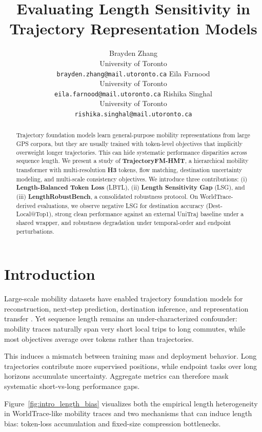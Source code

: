 \documentclass{article}
\title{Evaluating Length Sensitivity in Trajectory Representation Models}
\author{%
  Brayden Zhang\\
  University of Toronto\\
  \texttt{brayden.zhang@mail.utoronto.ca}
  \And
  Eila Farnood\\
  University of Toronto\\
  \texttt{eila.farnood@mail.utoronto.ca}
  \And
  Rishika Singhal\\
  University of Toronto\\
  \texttt{rishika.singhal@mail.utoronto.ca}
}
\begin{document}
\maketitle

\begin{abstract}
Trajectory foundation models learn general-purpose mobility representations from large GPS corpora, but they are usually trained with token-level objectives that implicitly overweight longer trajectories. This can hide systematic performance disparities across sequence length. We present a study of \textbf{TrajectoryFM-HMT}, a hierarchical mobility transformer with multi-resolution \textbf{H3} tokens, flow matching, destination uncertainty modeling, and multi-scale consistency objectives. We introduce three contributions: (i) \textbf{Length-Balanced Token Loss} (LBTL), (ii) \textbf{Length Sensitivity Gap} (LSG), and (iii) \textbf{LengthRobustBench}, a consolidated robustness protocol. On WorldTrace-derived evaluations, we observe negative LSG for destination accuracy (Dest-Local@Top1), strong clean performance against an external UniTraj baseline under a shared wrapper, and robustness degradation under temporal-order and endpoint perturbations.
\end{abstract}

\section{Introduction}
Large-scale mobility datasets have enabled trajectory foundation models for reconstruction, next-step prediction, destination inference, and representation transfer \citep{choudhury2024trajectory,zhu2025unitraj}. Yet sequence length remains an under-characterized confounder: mobility traces naturally span very short local trips to long commutes, while most objectives average over tokens rather than trajectories.

This induces a mismatch between training mass and deployment behavior. Long trajectories contribute more supervised positions, while endpoint tasks over long horizons accumulate uncertainty. Aggregate metrics can therefore mask systematic short-vs-long performance gaps.

Figure~\ref{fig:intro_length_bias} visualizes both the empirical length heterogeneity in WorldTrace-like mobility traces and two mechanisms that can induce length bias: token-loss accumulation and fixed-size compression bottlenecks.
\end{document}
